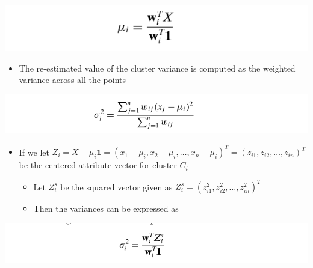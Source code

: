 \documentclass[11pt]{article}
\begin{document}
\begin{enumerate}
\begin{center}
\includegraphics[width=.9\linewidth]{Representative-based Clustering/screenshot_2018-11-27_20-35-45.png}
\end{center}

\begin{itemize}
\item The re-estimated value of the cluster variance is computed as the weighted variance across all the points
\end{itemize}
\begin{center}
\includegraphics[width=.9\linewidth]{Representative-based Clustering/screenshot_2018-11-27_20-38-34.png}
\end{center}

\begin{itemize}
\item If we let \(Z_i = X - \mu_i \mathbf 1=(x_1 - \mu_i, x_2 - \mu_i, \dots, x_n - \mu_i)^T = (z_{i1}, z_{i2}, \dots, z_{in})^T\) be the centered attribute vector for cluster \(C_i\)
\begin{itemize}
\item Let \(Z_i^s\) be the squared vector given as \(Z_i^s=(z_{i1}^2, z_{i2}^2, \dots, z_{in}^2)^T\)
\item Then the variances can be expressed as
\end{itemize}
\end{itemize}
\begin{center}
\includegraphics[width=.9\linewidth]{Representative-based Clustering/screenshot_2018-11-27_20-42-51.png}
\end{center}


\end{enumerate}
\end{document}
